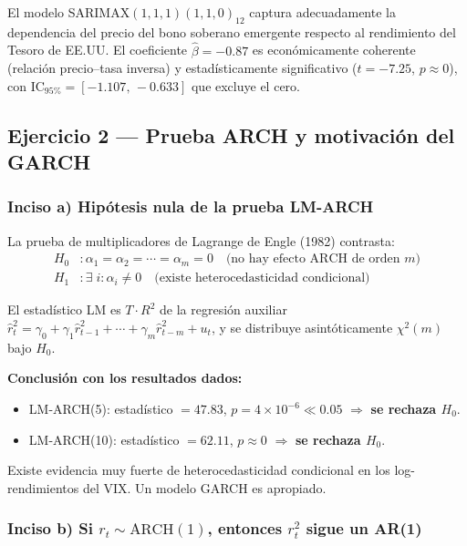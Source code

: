 \documentclass[12pt,a4paper]{article}
\begin{document}
\begin{hallazgo}
El modelo SARIMAX$(1,1,1)(1,1,0)_{12}$ captura adecuadamente la dependencia del precio del bono soberano emergente respecto al rendimiento del Tesoro de EE.UU. El coeficiente $\hat{\beta}=-0.87$ es económicamente coherente (relación precio–tasa inversa) y estadísticamente significativo ($t=-7.25$, $p\approx0$), con IC$_{95\%}=[-1.107,\,-0.633]$ que excluye el cero.
\end{hallazgo}

\subsection{Ejercicio 2 — Prueba ARCH y motivación del GARCH}

\subsubsection*{Inciso a) Hipótesis nula de la prueba LM-ARCH}

\begin{solucion}
La prueba de multiplicadores de Lagrange de Engle (1982) contrasta:
\begin{align*}
H_0 &: \alpha_1 = \alpha_2 = \cdots = \alpha_m = 0 \quad \text{(no hay efecto ARCH de orden } m\text{)}\\
H_1 &: \exists\;i:\alpha_i \neq 0 \quad \text{(existe heterocedasticidad condicional)}
\end{align*}

El estadístico LM es $T\cdot R^2$ de la regresión auxiliar $\hat{r}_t^2 = \gamma_0 + \gamma_1\hat{r}_{t-1}^2+\cdots+\gamma_m\hat{r}_{t-m}^2+u_t$, y se distribuye asintóticamente $\chi^2(m)$ bajo $H_0$.

\textbf{Conclusión con los resultados dados:}
\begin{itemize}[noitemsep]
  \item LM-ARCH(5): estadístico $=47.83$, $p=4\times10^{-6}\ll0.05$ $\Rightarrow$ \textbf{se rechaza $H_0$}.
  \item LM-ARCH(10): estadístico $=62.11$, $p\approx0$ $\Rightarrow$ \textbf{se rechaza $H_0$}.
\end{itemize}
Existe evidencia muy fuerte de heterocedasticidad condicional en los log-rendimientos del VIX. Un modelo GARCH es apropiado.
\end{solucion}

\subsubsection*{Inciso b) Si $r_t\sim\mathrm{ARCH}(1)$, entonces $r_t^2$ sigue un AR(1)}
\end{document}
